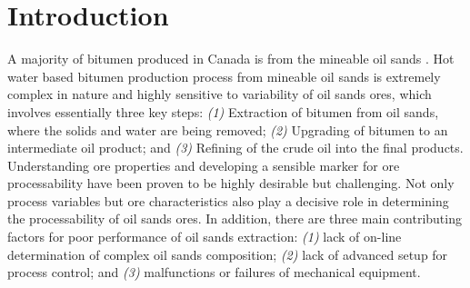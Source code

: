 \documentclass[10pt,journal,compsoc]{IEEEtran}
\begin{document}
\IEEEdisplaynotcompsoctitleabstractindextext


%
\IEEEpeerreviewmaketitle


\section{Introduction}

A majority of bitumen produced in Canada is from the mineable oil sands \cite{Masliyah2004}. Hot water based bitumen production process from mineable oil sands is extremely complex in nature and highly sensitive to variability of oil sands ores, which involves essentially three key steps: \emph{(1)} Extraction of bitumen from oil sands, where the solids and water are being removed; \emph{(2)} Upgrading of bitumen to an intermediate oil product; and \emph{(3)}  Refining of the crude oil into the final products. Understanding ore properties and developing a sensible marker for ore processability have been proven to be highly desirable but challenging. Not only process variables but ore characteristics also play a decisive role in determining the processability of oil sands ores. In addition, there are three main contributing factors for poor performance of oil sands extraction\cite{Fong2004}: \emph{(1)} lack of on-line determination of complex oil sands composition; \emph{(2)} lack of advanced setup for process control; and \emph{(3)} malfunctions or failures of mechanical equipment.
\end{document}
